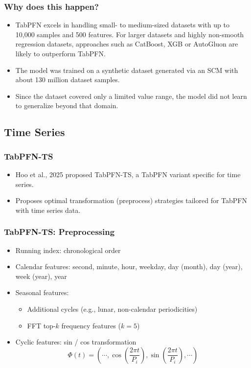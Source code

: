 \documentclass[compress]{beamer}
\begin{document}
\begin{frame}\frametitle{Why does this happen?}
	\begin{itemize}
		\item TabPFN excels in handling small- to medium-sized  datasets with up to 10,000 samples and 500 features. For larger datasets and highly non-smooth regression  datasets, approaches such as CatBoost, XGB or AutoGluon are likely to outperform TabPFN. \cite{Hollmann2025-pr}
		\item The model was trained on a synthetic dataset generated via an SCM with about 130 million dataset samples.
		\item Since the dataset covered only a limited value range, the model did not learn to generalize beyond that domain.
	\end{itemize}
\end{frame}

\subsection{Time Series}

\begin{frame}\frametitle{TabPFN-TS}
	\begin{itemize}
		\item Hoo et al., 2025 proposed TabPFN-TS, a TabPFN variant specific for time series.
		\item Proposes optimal transformation (preprocess) strategies tailored for TabPFN with time series data.
	\end{itemize}
\end{frame}

\begin{frame}\frametitle{TabPFN-TS: Preprocessing}
	\begin{itemize}
		\item Running index: chronological order
		\item Calendar features: second, minute, hour, weekday, day (month), day (year), week (year), year
		\item Seasonal features:
		\begin{itemize}
			\item Additional cycles (e.g., lunar, non-calendar periodicities)
			\item FFT top-$k$ frequency features ($k=5$)
		\end{itemize}
		\item Cyclic features: sin / cos transformation
		\[\Phi(t) = \left(\cdots, \cos \left(\frac{2 \pi t}{P_i}\right), \sin \left(\frac{2 \pi t}{P_{i}}\right), \cdots\right)\]
	\end{itemize}
\end{frame}
\end{document}
